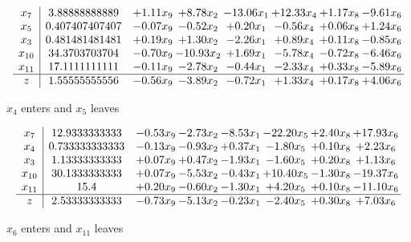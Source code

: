 \documentclass[8pt]{article}
\begin{document}
 \[\begin{array}{c| c c@{\hskip 2pt} c@{\hskip 2pt} c@{\hskip 2pt} c@{\hskip 2pt} c@{\hskip 2pt} c@{\hskip 2pt} }
 x_{7}   &  3.88888888889 & +  1.11 x_{9} & +  8.78 x_{2} & -13.06 x_{1} & + 12.33 x_{4} & +  1.17 x_{8} & -9.61 x_{6}\\
 x_{5}   &  0.407407407407 & -0.07 x_{9} & -0.52 x_{2} & +  0.20 x_{1} & -0.56 x_{4} & +  0.06 x_{8} & +  1.24 x_{6}\\
 x_{3}   &  0.481481481481 & +  0.19 x_{9} & +  1.30 x_{2} & -2.26 x_{1} & +  0.89 x_{4} & +  0.11 x_{8} & -0.85 x_{6}\\
 x_{10}   &  34.3703703704 & -0.70 x_{9} & -10.93 x_{2} & +  1.69 x_{1} & -5.78 x_{4} & -0.72 x_{8} & -6.46 x_{6}\\
 x_{11}   &  17.1111111111 & -0.11 x_{9} & -2.78 x_{2} & -0.44 x_{1} & -2.33 x_{4} & +  0.33 x_{8} & -5.89 x_{6}\\
\hline
z    &  1.55555555556 & -0.56 x_{9} & -3.89 x_{2} & -0.72 x_{1} & +  1.33 x_{4} & +  0.17 x_{8} & +  4.06 x_{6}\\
\end{array}\]


 $ x_{4} $ enters and $ x_{5} $ leaves 

 \[\begin{array}{c| c c@{\hskip 2pt} c@{\hskip 2pt} c@{\hskip 2pt} c@{\hskip 2pt} c@{\hskip 2pt} c@{\hskip 2pt} }
 x_{7}   &  12.9333333333 & -0.53 x_{9} & -2.73 x_{2} & -8.53 x_{1} & -22.20 x_{5} & +  2.40 x_{8} & + 17.93 x_{6}\\
 x_{4}   &  0.733333333333 & -0.13 x_{9} & -0.93 x_{2} & +  0.37 x_{1} & -1.80 x_{5} & +  0.10 x_{8} & +  2.23 x_{6}\\
 x_{3}   &  1.13333333333 & +  0.07 x_{9} & +  0.47 x_{2} & -1.93 x_{1} & -1.60 x_{5} & +  0.20 x_{8} & +  1.13 x_{6}\\
 x_{10}   &  30.1333333333 & +  0.07 x_{9} & -5.53 x_{2} & -0.43 x_{1} & + 10.40 x_{5} & -1.30 x_{8} & -19.37 x_{6}\\
 x_{11}   &  15.4 & +  0.20 x_{9} & -0.60 x_{2} & -1.30 x_{1} & +  4.20 x_{5} & +  0.10 x_{8} & -11.10 x_{6}\\
\hline
z    &  2.53333333333 & -0.73 x_{9} & -5.13 x_{2} & -0.23 x_{1} & -2.40 x_{5} & +  0.30 x_{8} & +  7.03 x_{6}\\
\end{array}\]


 $ x_{6} $ enters and $ x_{11} $ leaves 
\end{document}
